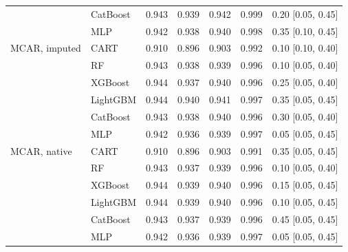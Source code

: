 \begin{table}[p]
\begin{tabular}{@{}llrrrrl@{}}
 & CatBoost & 0.943 & 0.939 & 0.942 & 0.999 & 0.20 [0.05, 0.45] \\
 & MLP & 0.942 & 0.938 & 0.940 & 0.998 & 0.35 [0.10, 0.45] \\
\midrule
MCAR, imputed & CART & 0.910 & 0.896 & 0.903 & 0.992 & 0.10 [0.10, 0.40] \\
 & RF & 0.943 & 0.938 & 0.939 & 0.996 & 0.10 [0.05, 0.40] \\
 & XGBoost & 0.944 & 0.937 & 0.940 & 0.996 & 0.25 [0.05, 0.40] \\
 & LightGBM & 0.944 & 0.940 & 0.941 & 0.997 & 0.35 [0.05, 0.45] \\
 & CatBoost & 0.943 & 0.938 & 0.940 & 0.996 & 0.30 [0.05, 0.40] \\
 & MLP & 0.942 & 0.936 & 0.939 & 0.997 & 0.05 [0.05, 0.45] \\
\midrule
MCAR, native & CART & 0.910 & 0.896 & 0.903 & 0.991 & 0.35 [0.05, 0.45] \\
 & RF & 0.943 & 0.937 & 0.939 & 0.996 & 0.10 [0.05, 0.40] \\
 & XGBoost & 0.944 & 0.939 & 0.940 & 0.996 & 0.15 [0.05, 0.45] \\
 & LightGBM & 0.944 & 0.939 & 0.940 & 0.996 & 0.10 [0.05, 0.45] \\
 & CatBoost & 0.943 & 0.937 & 0.939 & 0.996 & 0.45 [0.05, 0.45] \\
 & MLP & 0.942 & 0.936 & 0.939 & 0.997 & 0.05 [0.05, 0.45] \\
\bottomrule
\end{tabular}
\end{table}

